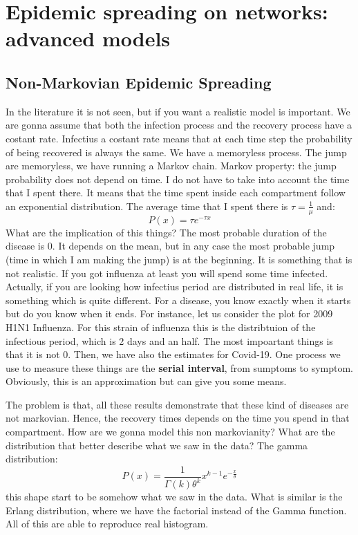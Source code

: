\documentclass[../main/main.tex]{subfiles}
\begin{document}
\chapter{Epidemic spreading on networks: advanced models}

\section{Non-Markovian Epidemic Spreading}

In the literature it is not seen, but if you want a realistic model is important. We are gonna assume that both the infection process and the recovery process have a costant rate.
Infectius a costant rate means that at each time step the probability of being recovered is always the same.
We have a memoryless process.
The jump are memoryless, we have running a Markov chain. Markov property: the jump probability does not depend on time. I do not have to take into account the time that I spent there.
It means that the time spent inside each compartment follow an exponential distribution.
The average time that I spent there is \( \tau = \frac{1}{\mu }\) and:
\begin{equation*}
  P(x) = \tau e^{- \tau x}
\end{equation*}
What are the implication of this things? The most probable duration of the disease is 0. It depends on the mean, but in any case the most probable jump (time in which I am making the jump) is at the beginning. It is something that is not realistic. If you got influenza at least you will spend some time infected. Actually, if you are looking how infectius period are distributed in real life, it is something which is quite different. For a disease, you know exactly when it starts but do you know when it ends.
For instance, let us consider the plot for 2009 H1N1 Influenza.
For this strain of influenza this is the distribtuion of the infectious period, which is 2 days and an half. The most impoartant things is that it is not 0.
Then, we have also the estimates for Covid-19.
One process we use to measure these things  are the \textbf{serial interval}, from sumptoms to symptom. Obviously, this is an approximation but can give you some means.


The problem is that, all these results demonstrate that these kind of diseases are not markovian. Hence, the recovery times depends on the time you spend in that compartment. How are we gonna model this non markovianity?
What are the distribution that better describe what we saw in the data? The gamma distribution:
\begin{equation*}
  P(x) = \frac{1}{\Gamma (k) \theta ^k} x^{k-1} e^{- \frac{x}{\theta }}
\end{equation*}
this shape start to be somehow what we saw in the data. What is similar is the Erlang distribution, where we have the factorial instead of the Gamma function.
All of this are able to reproduce real histogram.
\end{document}
